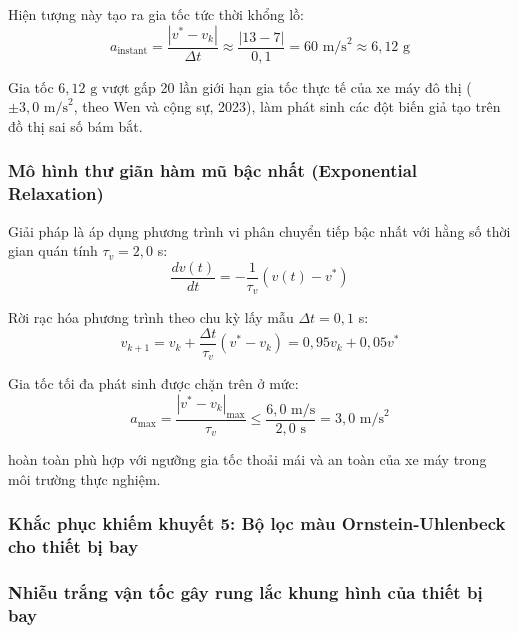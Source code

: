 Hiện tượng này tạo ra gia tốc tức thời khổng lồ:
\begin{equation}
a_{\text{instant}} = \frac{|v^* - v_k|}{\Delta t} \approx \frac{|13 - 7|}{0{,}1} = 60\text{ m/s}^2 \approx 6{,}12\text{ g}
\label{eq:unphysical-motorcycle-accel}
\end{equation}

Gia tốc $6{,}12\text{ g}$ vượt gấp 20 lần giới hạn gia tốc thực tế của xe máy đô thị ($\pm 3{,}0\text{ m/s}^2$, theo Wen và cộng sự, 2023), làm phát sinh các đột biến giả tạo trên đồ thị sai số bám bắt.

\subsubsection{Mô hình thư giãn hàm mũ bậc nhất (Exponential Relaxation)}

\hspace{0.5cm} Giải pháp là áp dụng phương trình vi phân chuyển tiếp bậc nhất với hằng số thời gian quán tính $\tau_v = 2{,}0$ s:
\begin{equation}
\frac{dv(t)}{dt} = -\frac{1}{\tau_v} (v(t) - v^*)
\label{eq:velocity-ode-relaxation}
\end{equation}

Rời rạc hóa phương trình theo chu kỳ lấy mẫu $\Delta t = 0{,}1$ s:
\begin{equation}
v_{k+1} = v_k + \frac{\Delta t}{\tau_v} (v^* - v_k) = 0{,}95 v_k + 0{,}05 v^*
\label{eq:discrete-velocity-relaxation}
\end{equation}

Gia tốc tối đa phát sinh được chặn trên ở mức:
\begin{equation}
a_{\max} = \frac{|v^* - v_k|_{\max}}{\tau_v} \le \frac{6{,}0\text{ m/s}}{2{,}0\text{ s}} = 3{,}0\text{ m/s}^2
\label{eq:clamped-max-acceleration}
\end{equation}

hoàn toàn phù hợp với ngưỡng gia tốc thoải mái và an toàn của xe máy trong môi trường thực nghiệm.

\subsubsection{Khắc phục khiếm khuyết 5: Bộ lọc màu Ornstein-Uhlenbeck cho thiết bị bay}

\subsubsection{Nhiễu trắng vận tốc gây rung lắc khung hình của thiết bị bay}

